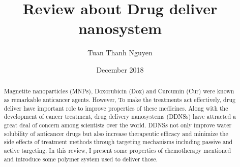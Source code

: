 \documentclass[10pt,a4paper]{article}
\title{Review about Drug deliver nanosystem}
\author{Tuan Thanh Nguyen}
\date{December 2018}
\begin{document}
\maketitle
\begin{abstract}
    Magnetite nanoparticles (MNPs), Doxorubicin (Dox) and Curcumin (Cur) were known as remarkable anticancer agents. However, To make the treatments act effectively, drug deliver have important role to improve properties of these medicines. Along with the development of cancer treatment, drug delivery nanosystems (DDNSs) have attracted a great deal of concern among scientists over the world. DDNSs not only improve water solubility of anticancer drugs but also increase therapeutic efficacy and minimize the side effects of treatment methods through targeting mechanisms including passive and active targeting\cite{bhbh1}. In this review, I present some properties of chemotherapy mentioned and introduce some polymer system used to deliver those.
\end{abstract}
\end{document}
